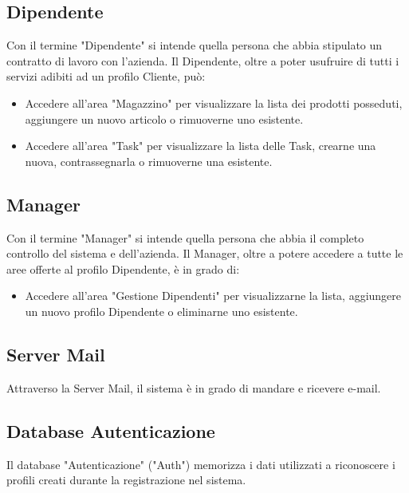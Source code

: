 \documentclass{report}
\begin{document}
\subsection{Dipendente}

Con il termine "Dipendente" si intende quella persona che abbia stipulato un contratto di lavoro con l'azienda. Il Dipendente, oltre a poter usufruire di tutti i servizi adibiti ad un profilo Cliente, può:
\begin{itemize}
	\item Accedere all'area "Magazzino" per visualizzare la lista dei prodotti posseduti, aggiungere un nuovo articolo o rimuoverne uno esistente.
	\item Accedere all'area "Task" per visualizzare la lista delle Task, crearne una nuova, contrassegnarla o rimuoverne una esistente. 
\end{itemize}

\subsection{Manager}

Con il termine "Manager" si intende quella persona che abbia il completo controllo del sistema e dell'azienda. Il Manager, oltre a potere accedere a tutte le aree offerte al profilo Dipendente, è in grado di:
\begin{itemize}
	\item Accedere all'area "Gestione Dipendenti" per visualizzarne la lista, aggiungere un nuovo profilo Dipendente o eliminarne uno esistente.
\end{itemize}

\subsection{Server Mail}
Attraverso la Server Mail, il sistema è in grado di mandare e ricevere e-mail. 

\subsection{Database Autenticazione}
Il database "Autenticazione" ("Auth") memorizza i dati utilizzati a riconoscere i profili creati durante la registrazione nel sistema.
\end{document}
